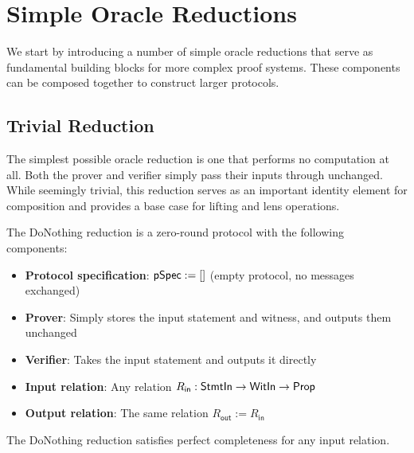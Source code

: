 \section{Simple Oracle Reductions}

We start by introducing a number of simple oracle reductions that serve as fundamental building blocks for more complex proof systems. These components can be composed together to construct larger protocols.

\subsection{Trivial Reduction}

The simplest possible oracle reduction is one that performs no computation at all. Both the prover and verifier simply pass their inputs through unchanged. While seemingly trivial, this reduction serves as an important identity element for composition and provides a base case for lifting and lens operations.

\begin{definition}
    \label{def:donothing_reduction}
    The DoNothing reduction is a zero-round protocol with the following components:
    \begin{itemize}
        \item \textbf{Protocol specification}: $\mathsf{pSpec} := []$ (empty protocol, no messages exchanged)
        \item \textbf{Prover}: Simply stores the input statement and witness, and outputs them unchanged
        \item \textbf{Verifier}: Takes the input statement and outputs it directly
        \item \textbf{Input relation}: Any relation $R_{\mathsf{in}} : \mathsf{StmtIn} \to \mathsf{WitIn} \to \mathsf{Prop}$
        \item \textbf{Output relation}: The same relation $R_{\mathsf{out}} := R_{\mathsf{in}}$
    \end{itemize}
    \leanok
\end{definition}

\begin{theorem}
    The DoNothing reduction satisfies perfect completeness for any input relation.
    \leanok
\end{theorem}

